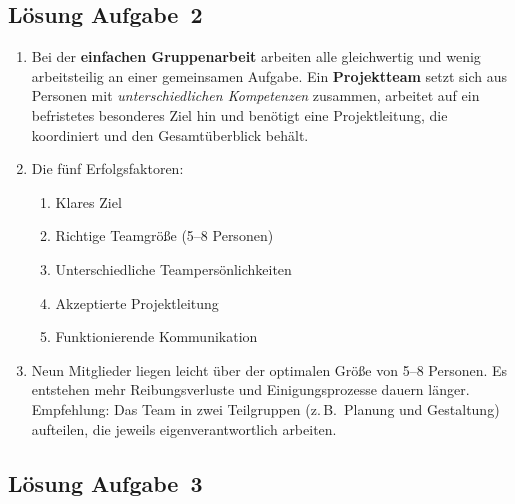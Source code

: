 \documentclass[11pt, a4paper]{article}
\begin{document}
\subsection*{Lösung Aufgabe~2}

\begin{enumerate}[label=(\alph*)]
  \item Bei der \textbf{einfachen Gruppenarbeit} arbeiten alle gleichwertig und wenig arbeitsteilig an einer gemeinsamen Aufgabe. Ein \textbf{Projektteam} setzt sich aus Personen mit \emph{unterschiedlichen Kompetenzen} zusammen, arbeitet auf ein befristetes besonderes Ziel hin und benötigt eine Projektleitung, die koordiniert und den Gesamtüberblick behält.

  \item Die fünf Erfolgsfaktoren:
  \begin{enumerate}
    \item Klares Ziel
    \item Richtige Teamgröße (5--8 Personen)
    \item Unterschiedliche Teampersönlichkeiten
    \item Akzeptierte Projektleitung
    \item Funktionierende Kommunikation
  \end{enumerate}

  \item Neun Mitglieder liegen leicht über der optimalen Größe von 5--8 Personen. Es entstehen mehr Reibungsverluste und Einigungsprozesse dauern länger. Empfehlung: Das Team in zwei Teilgruppen (z.\,B.\ Planung und Gestaltung) aufteilen, die jeweils eigenverantwortlich arbeiten.
\end{enumerate}

\subsection*{Lösung Aufgabe~3}
\end{document}
